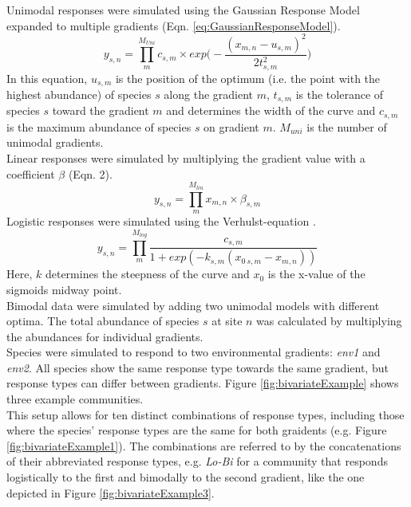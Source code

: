 		Unimodal responses were simulated using the Gaussian Response Model \citep{GauchJr1972} expanded to multiple gradients (Eqn. \ref{eq:GaussianResponseModel}).
			\begin{equation} \label{eq:GaussianResponseModel}
					y_{s,n} = \prod_{m}^{M_{Uni}} c_{s,m} \times exp\bigg(-\frac{(x_{m,n} - u_{s,m})^2}{2t^2_{s,m}}\bigg)		
			\end{equation}
		In this equation, $u_{s,m}$ is the position of the optimum (i.e. the point with the highest abundance) of species $s$ along the gradient $m$, $t_{s, m}$ is the tolerance of species $s$ toward the gradient $m$ and determines the width of the curve and $c_{s,m}$ is the maximum abundance of species $s$ on gradient $m$. 
		$M_{uni}$ is the number of unimodal gradients. \\
		Linear responses were simulated by multiplying the gradient value with a coefficient $\beta$ (Eqn. 2).
		\begin{equation}
		 				y_{s,n} = \prod_{m}^{M_{lin}} x_{m,n} \times \beta_{s,m}
		\end{equation}
		Logistic responses were simulated using the Verhulst-equation \citep[][Eqn. \ref{eq:Verhulst}]{verhulst1838notice}.
		\begin{equation} \label{eq:Verhulst}
						y_{s,n} = \prod_{m}^{M_{log}}  \frac{c_{s,m}}{1+ exp(-k_{s,m}(x_{0\ s,m}-x_{m,n}))}
		\end{equation}
		Here, $k$ determines the steepness of the curve and $x_0$ is the x-value of the sigmoids midway point.\\ 
		
		Bimodal data were simulated by adding two unimodal models with different optima.
		The total abundance of species $s$ at site $n$ was calculated by multiplying the abundances for individual gradients. \\
		
		Species were simulated to respond to two environmental gradients: \textit{env1} and \textit{env2}.
		All species show the same response type towards the same gradient, but response types can differ between gradients. 
		Figure \ref{fig:bivariateExample} shows three example communities.\\
	
		This setup allows for ten distinct combinations of response types, including those where the species' response types are the same for both graidents (e.g. Figure \ref{fig:bivariateExample1}).  
		The combinations are referred to by the concatenations of their abbreviated response types, e.g. \textit{Lo-Bi} for a community that responds logistically to the first and bimodally to the second gradient, like the one depicted in Figure \ref{fig:bivariateExample3}. 
	
